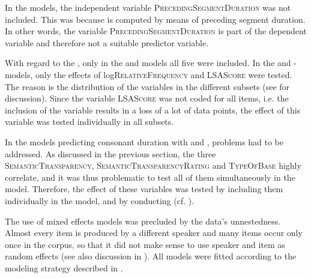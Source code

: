 In the  models, the independent variable \textsc{PrecedingSegmentDuration} was not included. This was because  is computed by means of preceding segment duration. In other words, the variable \textsc{PrecedingSegmentDuration} is part of the dependent variable and therefore not a suitable predictor variable.


With regard to the , only in the  and models all five  were included. In the  and -models, only the effects of log\textsc{RelativeFrequency} and \textsc{LSAScore} were tested. The reason is the distribution of the variables in the different subsets (see  for discussion). 
Since the variable \textsc{LSAScore} was not coded for all items, i.e. the inclusion of the variable results in a loss of a lot of data points, the effect of this variable was tested individually in all subsets. 

In the models predicting consonant duration with  and ,  problems had to be addressed. As discussed in the previous section, the three  \textsc{SemanticTransparency}, \textsc{SemanticTransparencyRating} and \textsc{TypeOfBase} highly correlate, and it was thus problematic to test all of them simultaneously in the model. Therefore, the effect of these variables was tested by including them individually in the model, and by conducting  (cf. ). 


The use of mixed effects models was precluded by the data's unnestedness. Almost every item is produced by a different speaker and many items occur only once in the corpus, so that it did not make sense to use speaker and item as random effects (see also discussion in ). All models were fitted according to the modeling strategy described in .



